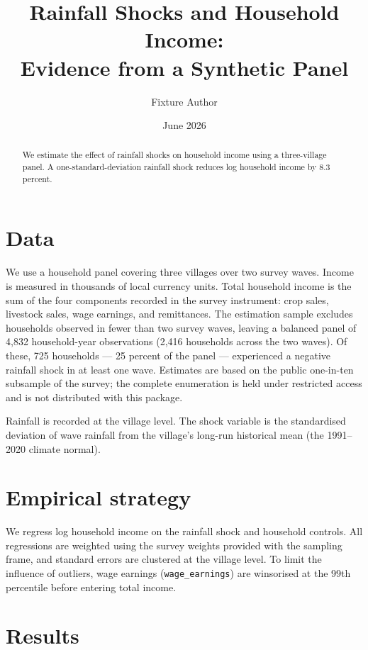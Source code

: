 \documentclass[12pt]{article}
\title{Rainfall Shocks and Household Income:\\Evidence from a Synthetic Panel}
\author{Fixture Author}
\date{June 2026}
\begin{document}
\maketitle

\begin{abstract}
We estimate the effect of rainfall shocks on household income using a three-village
panel. A one-standard-deviation rainfall shock reduces log household income by
8.3 percent.
\end{abstract}

\section{Data}

We use a household panel covering three villages over two survey waves. Income is measured
in thousands of local currency units.
Total household income is the sum of the four components recorded in the survey instrument:
crop sales, livestock sales, wage earnings, and remittances.
The estimation sample excludes households observed in fewer than two survey waves, leaving
a balanced panel of 4,832 household-year observations (2,416 households across the two waves).
Of these, 725 households --- 25 percent of the panel --- experienced a negative rainfall shock
in at least one wave.
Estimates are based on the public one-in-ten subsample of the survey; the complete enumeration
is held under restricted access and is not distributed with this package.

Rainfall is recorded at the village level. The shock variable is the standardised deviation
of wave rainfall from the village's long-run historical mean (the 1991--2020 climate
normal).

\section{Empirical strategy}

We regress log household income on the rainfall shock and household controls. All
regressions are weighted using the survey weights provided with the sampling frame, and
standard errors are clustered at the village level. To limit the influence of outliers,
wage earnings (\texttt{wage\_earnings}) are winsorised at the 99th percentile before
entering total income.

\section{Results}
\end{document}
